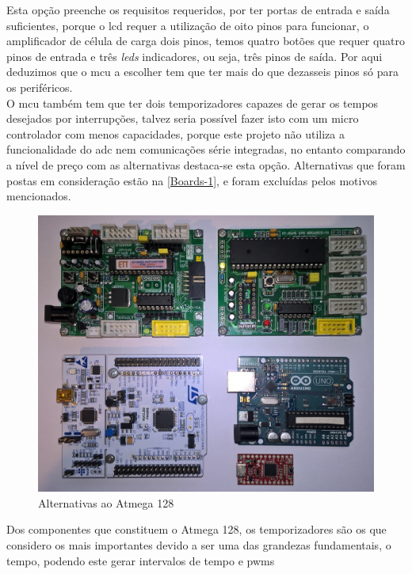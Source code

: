 Esta opção preenche os requisitos requeridos, por ter portas de entrada e saída suficientes, porque o \acs{lcd} requer a utilização de oito pinos para funcionar, o amplificador de célula de carga dois pinos, temos quatro botões que requer quatro pinos de entrada e três \textit{leds} indicadores, ou seja, três pinos de saída. Por aqui deduzimos que o \acs{mcu} a escolher tem que ter mais do que dezasseis pinos só para os periféricos.\\
O \acs{mcu} também tem que ter dois temporizadores capazes de gerar os tempos desejados por interrupções, talvez seria possível fazer isto com um micro controlador com menos capacidades, porque este projeto não utiliza a funcionalidade do \acs{adc} nem comunicações série integradas, no entanto comparando a nível de preço com as alternativas destaca-se esta opção.
\newpage
Alternativas que foram postas em consideração estão na \autoref{Boards-1}, e foram excluídas pelos motivos mencionados.\\
\begin{figure}[H]
	\centering
	\includegraphics[scale=0.15]{./image/PESTA/boards/Boards-2.jpg}
	\caption{Alternativas ao Atmega 128}
	\label{Boards-1}
\end{figure}
Dos componentes que constituem o Atmega 128, os temporizadores são os que considero os mais importantes devido a ser uma das grandezas fundamentais, o tempo, podendo este gerar intervalos de tempo e \acp{pwm}
